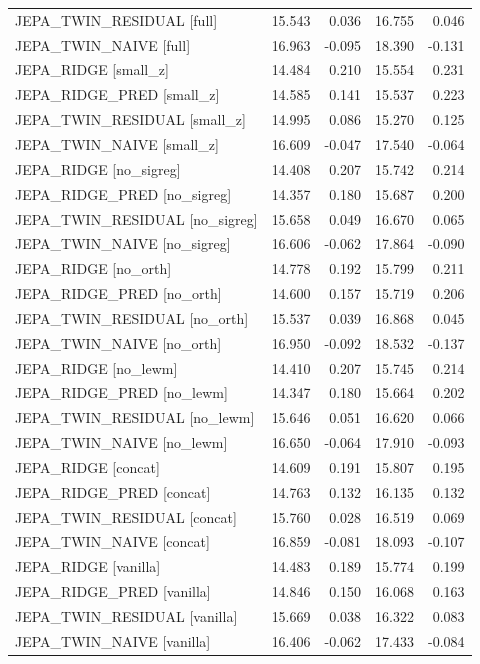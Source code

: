 \begin{table}[H]
\begin{tabular}{lrrrr}
JEPA\_TWIN\_RESIDUAL [full] & 15.543 & 0.036 & 16.755 & 0.046 \\
JEPA\_TWIN\_NAIVE [full] & 16.963 & -0.095 & 18.390 & -0.131 \\
JEPA\_RIDGE [small\_z] & 14.484 & 0.210 & 15.554 & 0.231 \\
JEPA\_RIDGE\_PRED [small\_z] & 14.585 & 0.141 & 15.537 & 0.223 \\
JEPA\_TWIN\_RESIDUAL [small\_z] & 14.995 & 0.086 & 15.270 & 0.125 \\
JEPA\_TWIN\_NAIVE [small\_z] & 16.609 & -0.047 & 17.540 & -0.064 \\
JEPA\_RIDGE [no\_sigreg] & 14.408 & 0.207 & 15.742 & 0.214 \\
JEPA\_RIDGE\_PRED [no\_sigreg] & 14.357 & 0.180 & 15.687 & 0.200 \\
JEPA\_TWIN\_RESIDUAL [no\_sigreg] & 15.658 & 0.049 & 16.670 & 0.065 \\
JEPA\_TWIN\_NAIVE [no\_sigreg] & 16.606 & -0.062 & 17.864 & -0.090 \\
JEPA\_RIDGE [no\_orth] & 14.778 & 0.192 & 15.799 & 0.211 \\
JEPA\_RIDGE\_PRED [no\_orth] & 14.600 & 0.157 & 15.719 & 0.206 \\
JEPA\_TWIN\_RESIDUAL [no\_orth] & 15.537 & 0.039 & 16.868 & 0.045 \\
JEPA\_TWIN\_NAIVE [no\_orth] & 16.950 & -0.092 & 18.532 & -0.137 \\
JEPA\_RIDGE [no\_lewm] & 14.410 & 0.207 & 15.745 & 0.214 \\
JEPA\_RIDGE\_PRED [no\_lewm] & 14.347 & 0.180 & 15.664 & 0.202 \\
JEPA\_TWIN\_RESIDUAL [no\_lewm] & 15.646 & 0.051 & 16.620 & 0.066 \\
JEPA\_TWIN\_NAIVE [no\_lewm] & 16.650 & -0.064 & 17.910 & -0.093 \\
JEPA\_RIDGE [concat] & 14.609 & 0.191 & 15.807 & 0.195 \\
JEPA\_RIDGE\_PRED [concat] & 14.763 & 0.132 & 16.135 & 0.132 \\
JEPA\_TWIN\_RESIDUAL [concat] & 15.760 & 0.028 & 16.519 & 0.069 \\
JEPA\_TWIN\_NAIVE [concat] & 16.859 & -0.081 & 18.093 & -0.107 \\
JEPA\_RIDGE [vanilla] & 14.483 & 0.189 & 15.774 & 0.199 \\
JEPA\_RIDGE\_PRED [vanilla] & 14.846 & 0.150 & 16.068 & 0.163 \\
JEPA\_TWIN\_RESIDUAL [vanilla] & 15.669 & 0.038 & 16.322 & 0.083 \\
JEPA\_TWIN\_NAIVE [vanilla] & 16.406 & -0.062 & 17.433 & -0.084 \\
\bottomrule
\end{tabular}
\end{table}

